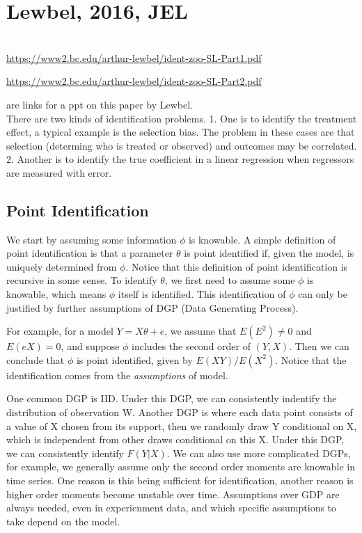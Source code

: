\documentclass{book}
\theoremstyle{plain}
\theoremstyle{definition}
\begin{document}


\section{Lewbel, 2016, JEL} %
\label{sec:lewbel_2016_jel}

\textbf{}\\

\url{https://www2.bc.edu/arthur-lewbel/ident-zoo-SL-Part1.pdf} 

\url{https://www2.bc.edu/arthur-lewbel/ident-zoo-SL-Part2.pdf}

are links for a ppt on this paper by Lewbel.\\

There are two kinds of identification problems. 
1. One is to identify the treatment effect, a typical example is the selection bias. The problem in these cases are that selection (determing who is treated or observed) and outcomes may be correlated. 
2. Another is to identify the true coefficient in a linear regression when regressors are measured with error.

\subsection{Point Identification} %
\label{sub:point_identification}

We start by assuming some information $\phi$ is knowable. A simple definition of point identification is that a parameter $\theta$ is point identified if, given the model, is uniquely determined from $\phi$. Notice that this definition of point identification is recursive in some sense. To identify $\theta$, we first need to assume some $\phi$ is knowable, which means $\phi$ itself is identified. This identification of $\phi$ can only be justified by further assumptions of DGP (Data Generating Process).

For example, for a model $Y = X\theta +e$, we assume that $E(E^2)\ne0$ and $E(eX)=0$, and suppose $\phi$ includes the second order of $(Y,X)$. Then we can conclude that $\phi$ is point identified, given by $E(XY)/E(X^2)$. Notice that the identification comes from the \textit{assumptions} of model.

One common DGP is IID. Under this DGP, we can consistently indentify the distribution of observation W. Another DGP is where each data point consists of a value of X chosen from its support, then we randomly draw Y conditional on X, which is independent from other draws conditional on this X. Under this DGP, we can consistently identify $F(Y|X)$. We can also use more complicated DGPs, for example, we generally assume only the second order moments are knowable in time series. One reason is this being sufficient for identification, another reason is higher order moments become unstable over time. Assumptions over GDP are always needed, even in experienment data, and which specific assumptions to take depend on the model.
\end{document}
